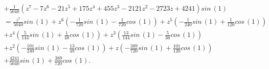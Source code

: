 \begin{description}
\begin{displaymath}
\begin{split}
                             &+ \frac{1}{5040} \left(z^{7} - 7 z^{6} - 21 z^{5} + 175 z^{4} + 455 z^{3} - 2121 z^{2} - 2723 z + 4241\right) sin\,{\left (1 \right )}\\
                             &= \frac{z^{7}}{5040} sin\,{\left (1 \right )} + z^{6} \left(- \frac{1}{720} sin\,{\left (1 \right )} - \frac{1}{720} cos\,{\left (1 \right )}\right) + z^{5} \left(- \frac{1}{240} sin\,{\left (1 \right )} + \frac{1}{120} cos\,{\left (1 \right )}\right) \\
                             &+ z^{4} \left(\frac{5}{144} sin\,{\left (1 \right )} + \frac{1}{48} cos\,{\left (1 \right )}\right) + z^{3} \left(\frac{13}{144} sin\,{\left (1 \right )} - \frac{5}{36} cos\,{\left (1 \right )}\right)\\
                             &+ z^{2} \left(- \frac{101}{240} sin\,{\left (1 \right )} - \frac{13}{48} cos\,{\left (1 \right )}\right) + z \left(- \frac{389}{720} sin\,{\left (1 \right )} + \frac{101}{120} cos\,{\left (1 \right )}\right) \\
                             &+ \frac{4241}{5040} sin\,{\left (1 \right )} + \frac{389}{720} cos\,{\left (1 \right )}.
    \end{split}
\end{displaymath}
\end{description}
